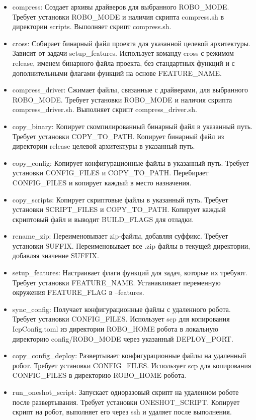\begin{itemize}
    \item {compress}: Создает архивы драйверов для выбранного ROBO\_MODE. Требует установки ROBO\_MODE и наличия скрипта compress.sh в директории scripts. Выполняет скрипт compress.sh.
    \item {cross}: Собирает бинарный файл проекта для указанной целевой архитектуры. Зависит от задачи setup\_features. Использует команду cross с режимом release, именем бинарного файла проекта, без стандартных функций и с дополнительными флагами функций на основе FEATURE\_NAME.
    \item {compress\_driver}: Сжимает файлы, связанные с драйверами, для выбранного ROBO\_MODE. Требует установки ROBO\_MODE и наличия скрипта compress\_driver.sh. Выполняет скрипт compress\_driver.sh.
    \item {copy\_binary}: Копирует скомпилированный бинарный файл в указанный путь. Требует установки COPY\_TO\_PATH. Копирует бинарный файл из директории release целевой архитектуры в указанный путь.
    \item {copy\_config}: Копирует конфигурационные файлы в указанный путь. Требует установки CONFIG\_FILES и COPY\_TO\_PATH. Перебирает CONFIG\_FILES и копирует каждый в место назначения.
    \item {copy\_scripts}: Копирует скриптовые файлы в указанный путь. Требует установки SCRIPT\_FILES и COPY\_TO\_PATH. Копирует каждый скриптовый файл и выводит BUILD\_FLAGS для отладки.
    \item {rename\_zip}: Переименовывает zip-файлы, добавляя суффикс. Требует установки SUFFIX. Переименовывает все .zip файлы в текущей директории, добавляя значение SUFFIX.
    \item {setup\_features}: Настраивает флаги функций для задач, которые их требуют. Требует установки FEATURE\_NAME. Устанавливает переменную окружения FEATURE\_FLAG в --features.
    \item {sync\_config}: Получает конфигурационные файлы с удаленного робота. Требует установки CONFIG\_FILES. Использует scp для копирования IcpConfig.toml из директории ROBO\_HOME робота в локальную директорию config/ROBO\_MODE через указанный DEPLOY\_PORT.
    \item {copy\_config\_deploy}: Развертывает конфигурационные файлы на удаленный робот. Требует установки CONFIG\_FILES. Использует scp для копирования CONFIG\_FILES в директорию ROBO\_HOME робота.
    \item {run\_oneshot\_script}: Запускает одноразовый скрипт на удаленном роботе после развертывания. Требует установки ONESHOT\_SCRIPT. Копирует скрипт на робот, выполняет его через ssh и удаляет после выполнения.

\end{itemize}

